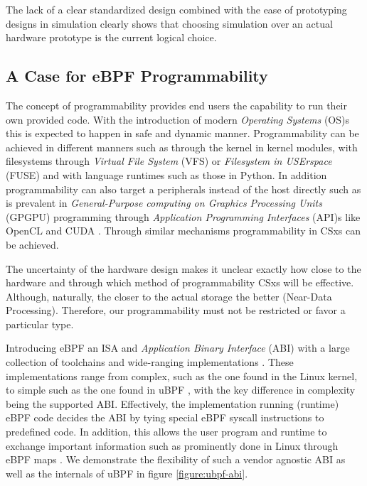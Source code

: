 The lack of a clear standardized design combined with the ease of prototyping
designs in simulation clearly shows that choosing simulation over an actual
hardware prototype is the current logical choice.

\subsection{A Case for eBPF Programmability}

The concept of programmability provides end users the capability to run their
own provided code. With the introduction of modern \textit{Operating Systems}
(OS)s this is expected to happen in safe and dynamic manner. Programmability
can be achieved in different manners such as through the kernel in kernel
modules, with filesystems through \textit{Virtual File System} (VFS) or
\textit{Filesystem in USErspace} (FUSE) and with language runtimes such as those
in Python. In addition programmability can also target a peripherals instead of
the host directly such as is prevalent in \textit{General-Purpose computing on
Graphics Processing Units} (GPGPU) programming through \textit{Application
Programming Interfaces} (API)s like OpenCL \cite{opencl} and CUDA \cite{cuda}.
Through similar mechanisms programmability in CSxs can be achieved.

The uncertainty of the hardware design makes it unclear exactly how close to the
hardware and through which method of programmability CSxs will be effective.
Although, naturally, the closer to the actual storage the better
(Near-Data Processing). Therefore, our programmability must not be restricted or
favor a particular type.

Introducing eBPF an ISA and \textit{Application Binary Interface} (ABI) with a
large collection of toolchains and wide-ranging implementations
\cite{what-ebpf, McCanne1993TheBP}. These implementations range from complex,
such as the one found in the Linux kernel, to simple such as the one found in
uBPF \cite{ubpf}, with the key difference in complexity being the supported ABI.
Effectively, the implementation running (runtime) eBPF code decides the ABI by
tying special eBPF syscall instructions to predefined code. In addition, this
allows the user program and runtime to exchange important information such as
prominently done in Linux through eBPF maps \cite{bpf-man}. We demonstrate the
flexibility of such a vendor agnostic ABI as well as the internals of uBPF in
figure \ref{figure:ubpf-abi}.

